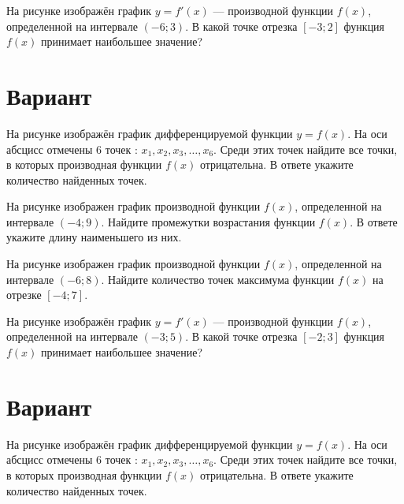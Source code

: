 \begin{taskBN}{4}
На рисунке изображён график $y=f'(x)$ — производной функции $f(x)$, определенной на интервале $(-6;3)$. В какой точке отрезка $[-3; 2]$ функция $f(x)$ принимает наибольшее значение?
\end{taskBN}

\newpage\section{Вариант}\begin{taskBN}{1}
На рисунке изображён график дифференцируемой функции $y=f(x)$. На оси абсцисс отмечены 6 точек : $x_1, x_2, x_3, \dots, x_6$. Среди этих точек найдите все точки, в которых производная функции $f(x)$ отрицательна. В ответе укажите количество найденных точек.
\end{taskBN}

\begin{taskBN}{2}
На рисунке изображен график производной функции $f(x)$, определенной на интервале $(-4;9)$. Найдите промежутки возрастания функции $f(x)$. В ответе укажите длину наименьшего из них.
\end{taskBN}

\begin{taskBN}{3}
На рисунке изображен график производной функции $f(x)$, определенной на интервале $(-6;8)$. Найдите количество точек максимума функции $f(x)$ на отрезке $[-4;7]$. 
\end{taskBN}

\begin{taskBN}{4}
На рисунке изображён график $y=f'(x)$ — производной функции $f(x)$, определенной на интервале $(-3;5)$. В какой точке отрезка $[-2; 3]$ функция $f(x)$ принимает наибольшее значение?
\end{taskBN}

\newpage\section{Вариант}\begin{taskBN}{1}
На рисунке изображён график дифференцируемой функции $y=f(x)$. На оси абсцисс отмечены 6 точек : $x_1, x_2, x_3, \dots, x_6$. Среди этих точек найдите все точки, в которых производная функции $f(x)$ отрицательна. В ответе укажите количество найденных точек.
\end{taskBN}

